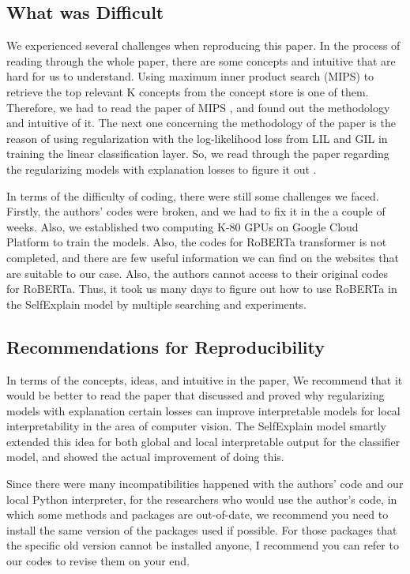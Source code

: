 \documentclass{article}
\begin{document}
\subsection{What was Difficult}

We experienced several challenges when reproducing this paper. In the process of reading through the whole paper, there are some concepts and intuitive that are hard for us to understand. Using maximum inner product search (MIPS) to retrieve the top relevant K concepts from the concept store is one of them. Therefore, we had to read the paper of MIPS \cite{Guu2020REALMRL}, and found out the methodology and intuitive of it. The next one concerning the methodology of the paper is the reason of using regularization with the log-likelihood loss from LIL and GIL in training the linear classification layer. So, we read through the paper regarding the regularizing models with explanation losses to figure it out \cite{10.5555/3327757.3327875}. 

In terms of the difficulty of coding, there were still some challenges we faced. Firstly, the authors' codes were broken, and we had to fix it in the a couple of weeks. Also, we established two computing K-80 GPUs on Google Cloud Platform to train the models. Also, the codes for RoBERTa transformer is not completed, and there are few useful information we can find on the websites that are suitable to our case. Also, the authors cannot access to their original codes for RoBERTa. Thus, it took us many days to figure out how to use RoBERTa in the SelfExplain model by multiple searching and experiments.\\ 


\subsection{Recommendations for Reproducibility}

In terms of the concepts, ideas, and intuitive in the paper, We recommend that it would be better to read the 
paper \cite{10.5555/3327757.3327875} that discussed and proved why regularizing models with explanation certain
 losses can improve interpretable models for local interpretability in the area of computer vision.
  The SelfExplain model smartly extended this idea for both global and local interpretable output for the 
  classifier model, and showed the actual improvement of doing this. 

Since there were many incompatibilities happened with the authors' code and our local Python interpreter, for
 the researchers who would use the author's code, in which some methods and packages are out-of-date, we 
 recommend you need to install the same version of the packages used if possible. For those packages that the 
 specific old version cannot be installed anyone, I recommend you can refer to our codes to revise them on your 
 end. 
\end{document}
